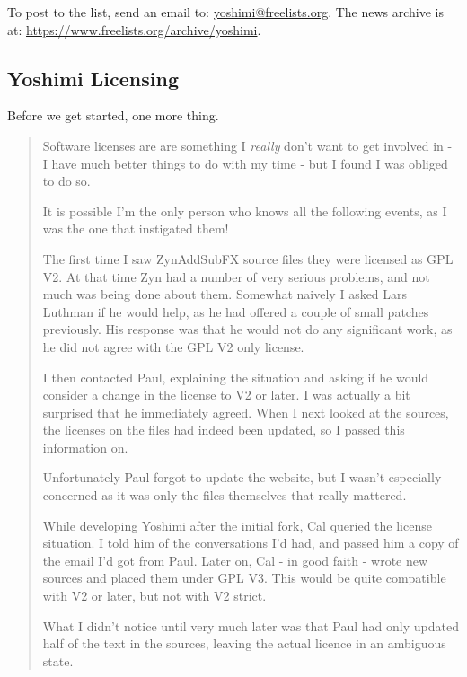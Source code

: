 \documentclass[
 11pt,
 twoside,
 a4paper,
 final                                 %
]{article}
\begin{document}
   To post to the list, send an email to: \url{yoshimi@freelists.org}.
   The news archive is at: \url{https://www.freelists.org/archive/yoshimi}.

\subsection{Yoshimi Licensing}
\label{subsec:introduction_yoshimi_licensing}

   Before we get started, one more thing.

   \begin{quotation}
      Software licenses are are something I \textsl{really}
      don't want to get involved in - I have much better things to do with my
      time - but I found I was obliged to do so.

      It is possible I'm the only person who knows all the following events, as
      I was the one that instigated them!

      The first time I saw ZynAddSubFX source files they were licensed as GPL
      V2. At that time Zyn had a number of very serious problems, and not much
      was being done about them. Somewhat naively I asked Lars Luthman if he
      would help, as he had offered a couple of small patches previously. His
      response was that he would not do any significant work, as he did not
      agree with the GPL V2 only license.

      I then contacted Paul, explaining the situation and asking if he would
      consider a change in the license to V2 or later. I was actually a bit
      surprised that he immediately agreed. When I next looked at the sources,
      the licenses on the files had indeed been updated, so I passed this
      information on.

      Unfortunately Paul forgot to update the website, but I wasn't especially
      concerned as it was only the files themselves that really mattered.

      While developing Yoshimi after the initial fork, Cal queried the license
      situation. I told him of the conversations I'd had, and passed him a copy
      of the email I'd got from Paul. Later on, Cal - in good faith - wrote new
      sources and placed them under GPL V3. This would be quite compatible with
      V2 or later, but not with V2 strict.

      What I didn't notice until very much later was that Paul had only updated
      half of the text in the sources, leaving the actual licence in an
      ambiguous state.


\end{quotation}
\end{document}
